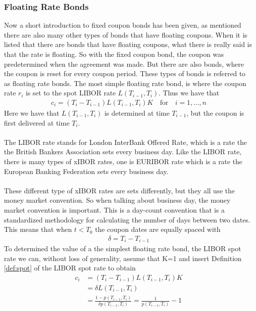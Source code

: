 \subsubsection{Floating Rate Bonds}
Now a short introduction to fixed coupon bonds has been given, as mentioned there are also many 
other types of bonds that have floating coupons. When it is listed that there are bonds that have
floating coupons, what there is really said is that the rate is floating. So with the fixed coupon
bond, the coupon was predetermined when the agreement was made. But there are also bonds, where
the coupon is reset for every coupon period. These types of bonds is referred to as floating 
rate bonds. The most simple floating rate bond, is where the coupon rate $r_i$ is set to 
the spot LIBOR rate $L(T_{i-1}, T_i)$. Thus we have that 
\begin{align*}
    c_i = (T_i-T_{i-1})L(T_{i-1},T_i)K \quad \text{for} \quad i=1,...,n
\end{align*}
Here we have that $L(T_{i-1},T_i)$ is determined at time $T_{i-1}$, but the coupon is first 
delivered at time $T_i$. \cite{Bjork}  
\\\\
The LIBOR rate stands for London InterBank Offered Rate, which is a rate the the 
British Bankers Association sets every business day. Like the LIBOR rate, there is many types
of xIBOR rates, one is EURIBOR rate which is a rate the 
European Banking Federation sets every business day. 
\\\\
These different type of xIBOR rates are sets differently, but they all use the money market convention. 
So when talking about business day, the money market convention is important. This is a day-count 
convention that is a standardized methodology for calculating the number of days between two dates.
This means that when $t <T_0$  the coupon dates are equally spaced with  
\begin{align*}
    \delta = T_{i}-T_{i-1}
\end{align*}
To determined the value of a the simplest floating rate bond, the LIBOR spot rate we can, without
loss of generality, assume that K=1 and insert Definition \ref{def:spot} of the LIBOR spot rate 
to obtain
\begin{align*}
    c_i &= (T_i-T_{i-1})L(T_{i-1},T_i)K \\
        &= \delta L(T_{i-1},T_i) \\
        &= \frac{1- p(T_{i-1},T_i)}{\delta p(T_{i-1},T_i)} = \frac{1}{p(T_{i-1},T_i)}-1
\end{align*}
